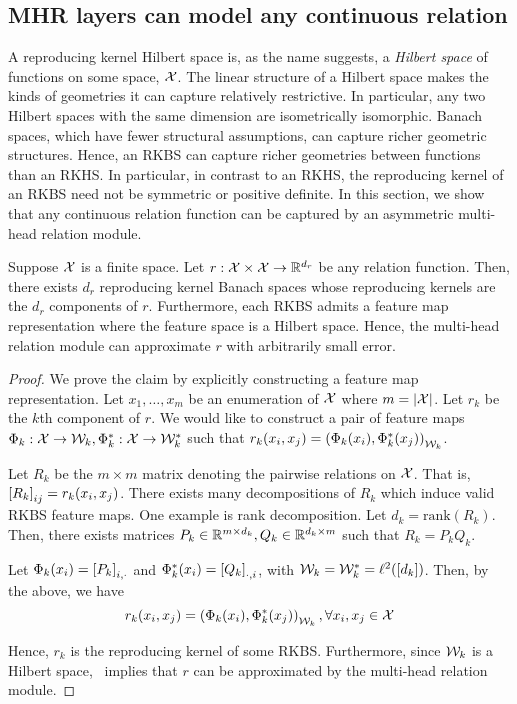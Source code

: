 \subsection{MHR layers can model any continuous relation}

A reproducing kernel Hilbert space is, as the name suggests, a \textit{Hilbert space} of functions on some space, ${\mathcal{X}}$. The linear structure of a Hilbert space makes the kinds of geometries it can capture relatively restrictive. In particular, any two Hilbert spaces with the same dimension are isometrically isomorphic. Banach spaces, which have fewer structural assumptions, can capture richer geometric structures. Hence, an RKBS can capture richer geometries between functions than an RKHS. In particular, in contrast to an RKHS, the reproducing kernel of an RKBS need not be symmetric or positive definite. In this section, we show that any continuous relation function can be captured by an asymmetric multi-head relation module.

\begin{theorem}\label{thm:mhr_approximates_finite_rels}
    Suppose ${\mathcal{X}}$ is a finite space. Let $r: {\mathcal{X}} \times {\mathcal{X}} \to \mathbb{R}^{d_r}$ be any relation function. Then, there exists $d_r$ reproducing kernel Banach spaces whose reproducing kernels are the $d_r$ components of $r$. Furthermore, each RKBS admits a feature map representation where the feature space is a Hilbert space. Hence, the multi-head relation module can approximate $r$ with arbitrarily small error.
\end{theorem}

\begin{proof}
    \hphantom{~}

    We prove the claim by explicitly constructing a feature map representation. Let $x_1, \ldots, x_m$ be an enumeration of ${\mathcal{X}}$ where $m = \left\lvert{\mathcal{X}}\right\rvert$. Let $r_k$ be the $k$th component of $r$. We would like to construct a pair of feature maps $\Phi_k: {\mathcal{X}} \to {\mathcal{W}}_k, \Phi_k^*: {\mathcal{X}} \to {\mathcal{W}}_k^*$ such that $r_k(x_i, x_j) = \left(\Phi_k(x_i), \Phi_k^*(x_j)\right)_{{\mathcal{W}}_k}$.

    Let $R_k$ be the $m \times m$ matrix denoting the pairwise relations on ${\mathcal{X}}$. That is, $\left[R_k\right]_{ij} = r_k(x_i, x_j)$. There exists many decompositions of $R_k$ which induce valid RKBS feature maps. One example is rank decomposition. Let $d_k = \mathrm{rank}(R_k)$. Then, there exists matrices $P_k \in \mathbb{R}^{m \times d_k}, Q_k \in \mathbb{R}^{d_k \times m}$ such that $R_k = P_k Q_k$.

    Let $\Phi_k(x_i) = \left[P_k\right]_{i, \cdot}$ and $\Phi_k^*(x_i) = \left[Q_k\right]_{\cdot, i}$, with ${\mathcal{W}}_k = {\mathcal{W}}_k^* = \ell^2([d_k])$. Then, by the above, we have
    \begin{equation*}
        r_k(x_i, x_j) = \left(\Phi_k(x_i), \Phi_k^*(x_j)\right)_{{\mathcal{W}}_k}, \forall x_i, x_j \in {\mathcal{X}}
    \end{equation*}

    Hence, $r_k$ is the reproducing kernel of some RKBS. Furthermore, since ${\mathcal{W}}_k$ is a Hilbert space,~ implies that $r$ can be approximated by the multi-head relation module.
\end{proof}

